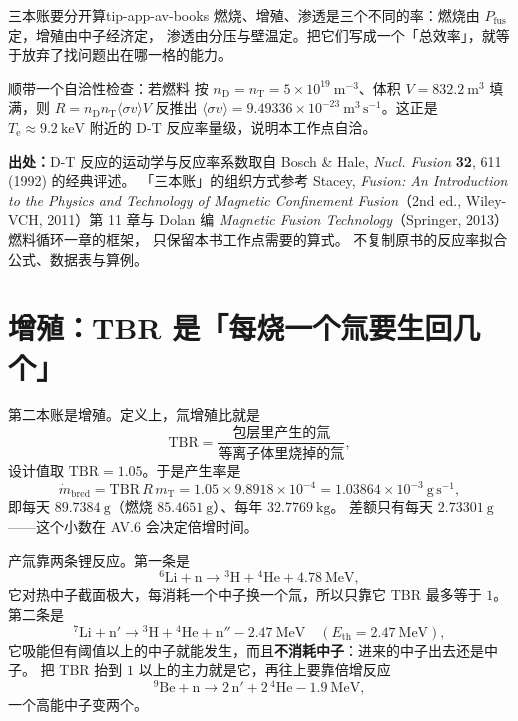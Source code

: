 \begin{tip}{三本账要分开算}{tip-app-av-books}
燃烧、增殖、渗透是三个不同的率：燃烧由 $P_\mathrm{fus}$ 定，增殖由中子经济定，
渗透由分压与壁温定。把它们写成一个「总效率」，就等于放弃了找问题出在哪一格的能力。
\end{tip}

顺带一个自洽性检查：若燃料
按 $n_\mathrm{D}=n_\mathrm{T}=5\times10^{19}\ \mathrm{m^{-3}}$、体积 $V=832.2\ \mathrm{m^{3}}$
填满，则 $R=n_\mathrm{D}n_\mathrm{T}\langle\sigma v\rangle V$ 反推出
$\langle\sigma v\rangle=9.49336\times10^{-23}\ \mathrm{m^{3}\,s^{-1}}$。这正是
$T_\mathrm{e}\approx9.2\ \mathrm{keV}$ 附近的 D-T 反应率量级，说明本工作点自洽。

{\footnotesize
\textbf{出处：}D-T 反应的运动学与反应率系数取自 Bosch \& Hale,
\emph{Nucl. Fusion} \textbf{32}, 611 (1992) 的经典评述。
「三本账」的组织方式参考
Stacey, \emph{Fusion: An Introduction to the Physics and Technology of Magnetic
Confinement Fusion}（2nd ed., Wiley-VCH, 2011）第 11 章与 Dolan 编
\emph{Magnetic Fusion Technology}（Springer, 2013）燃料循环一章的框架，
只保留本书工作点需要的算式。
不复制原书的反应率拟合公式、数据表与算例。
}

\section{增殖：TBR 是「每烧一个氚要生回几个」}
\label{sec:app-av-breeding}

第二本账是增殖。定义上，氚增殖比就是
\begin{equation}
\mathrm{TBR}=\frac{\text{包层里产生的氚}}{\text{等离子体里烧掉的氚}},
\label{eq:app-av-tbr}
\end{equation}
设计值取 $\mathrm{TBR}=1.05$。于是产生率是
\begin{equation}
\dot m_\mathrm{bred}=\mathrm{TBR}\,R\,m_\mathrm{T}
=1.05\times9.8918\times10^{-4}
=1.03864\times10^{-3}\ \mathrm{g\,s^{-1}},
\label{eq:app-av-bred}
\end{equation}
即每天 $89.7384\ \mathrm{g}$（燃烧 $85.4651\ \mathrm{g}$）、每年 $32.7769\ \mathrm{kg}$。
差额只有每天 $2.73301\ \mathrm{g}$——这个小数在 AV.6 会决定倍增时间。

产氚靠两条锂反应。第一条是
\begin{equation}
{}^{6}\mathrm{Li}+\mathrm{n}\rightarrow{}^{3}\mathrm{H}+{}^{4}\mathrm{He}+4.78\ \mathrm{MeV},
\label{eq:app-av-li6}
\end{equation}
它对热中子截面极大，每消耗一个中子换一个氚，所以只靠它 TBR 最多等于 $1$。
第二条是
\begin{equation}
{}^{7}\mathrm{Li}+\mathrm{n}'\rightarrow{}^{3}\mathrm{H}+{}^{4}\mathrm{He}+\mathrm{n}''
-2.47\ \mathrm{MeV}\quad(E_\mathrm{th}=2.47\ \mathrm{MeV}),
\label{eq:app-av-li7}
\end{equation}
它吸能但有阈值以上的中子就能发生，而且\textbf{不消耗中子}：进来的中子出去还是中子。
把 TBR 抬到 $1$ 以上的主力就是它，再往上要靠倍增反应
\begin{equation}
{}^{9}\mathrm{Be}+\mathrm{n}\rightarrow2\,\mathrm{n}'+2\,{}^{4}\mathrm{He}-1.9\ \mathrm{MeV},
\label{eq:app-av-be}
\end{equation}
一个高能中子变两个。

